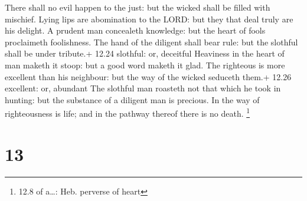  There shall no evil happen to the just: but the wicked
shall be filled with mischief.  Lying lips are abomination
to the LORD: but they that deal truly are his delight.  A
prudent man concealeth knowledge: but the heart of fools proclaimeth
foolishness.  The hand of the diligent shall bear rule: but
the slothful shall be under tribute.+ 12.24 slothful: or, deceitful
 Heaviness in the heart of man maketh it stoop: but a good
word maketh it glad.  The righteous is more excellent than
his neighbour: but the way of the wicked seduceth them.+ 12.26
excellent: or, abundant  The slothful man roasteth not that
which he took in hunting: but the substance of a diligent man is
precious.  In the way of righteousness is life; and in the
pathway thereof there is no death. \footnote{12.8 of a\ldots: Heb.
  perverse of heart}

\hypertarget{section-12}{%
\section{13}\label{section-12}}

